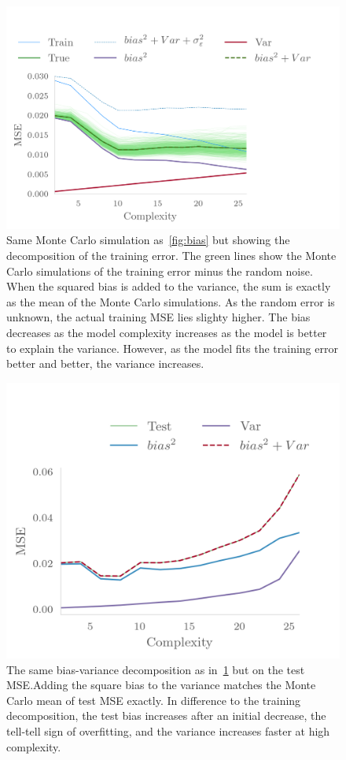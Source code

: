 \begin{figure}[]
  \centering
  \includegraphics[]{figures/trainbiasvariance.png}
  \caption{\label{fig:biastrain} Same Monte Carlo simulation as~\cref{fig:bias}
  but showing the decomposition of the training error. The green lines show the
  Monte Carlo simulations of the training error minus the random noise. When the
squared bias is added to the variance, the sum is exactly as the mean of the
Monte Carlo simulations. As the random error is unknown, the actual training MSE
lies slighty higher. The bias decreases as the model complexity increases as the
model is better to explain the variance. However, as the model fits the training
error better and better, the variance increases.}
\end{figure}


\begin{figure}[]
  \centering
  \includegraphics[]{figures/testbiasvariance.png}
  \caption{\label{fig:biastest} The same bias-variance decomposition as
    in~\cref{fig:biastrain} but on the test MSE.\@ Adding the square bias to the
    variance matches the Monte Carlo mean of test MSE exactly. In difference to
    the training decomposition, the test bias increases after an initial
    decrease, the tell-tell sign of overfitting, and the variance increases
    faster at high complexity.}
\end{figure}
